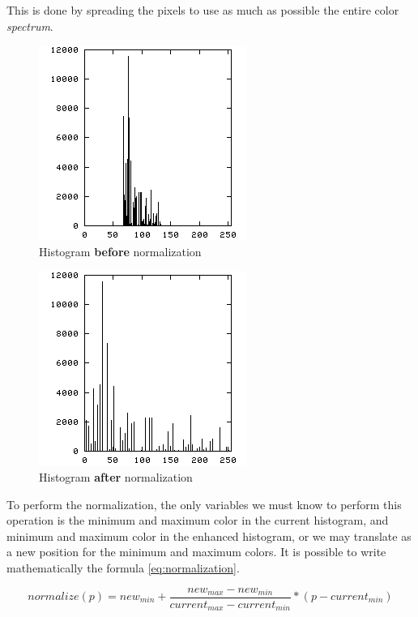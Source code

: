 \documentclass{article}
\begin{document}
		This is done by spreading the pixels to use as much as possible the entire color \textit{spectrum}.
		
		\begin{figure} [H]
			\centering
			\includegraphics[scale=0.5]{images/histogram_1}
			\caption{Histogram \textbf{before} normalization\label{histogram_1}}
		\end{figure}

		\begin{figure} [H]
			\centering
			\includegraphics[scale=0.5]{images/histogram_2}
			\caption{Histogram \textbf{after} normalization\label{histogram_2}}
		\end{figure}

		To perform the normalization, the only variables we must know to perform this operation is the minimum and maximum color in the current histogram, 
		and minimum and maximum color in the enhanced histogram, or we may translate as a new position for the minimum and maximum colors. It is possible
		to write mathematically the formula \ref{eq:normalization}.


		\begin{equation}
			normalize(p)=new_{min}+\frac{new_{max}-new_{min}}{current_{max}-current_{min}}*(p-current_{min})
			\label{eq:normalization}
		\end{equation}
		
\end{document}
